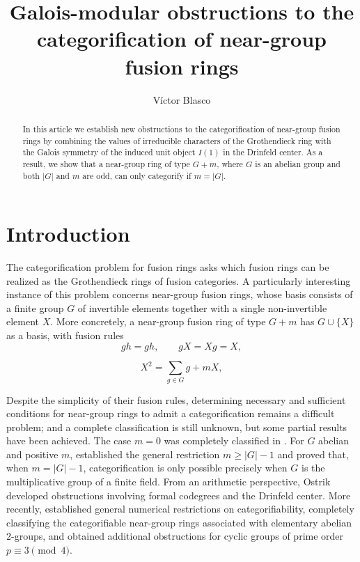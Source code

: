 \documentclass[a4paper,twoside,11pt]{amsart}
\title[Obstructions to the categorification of near-group rings]{Galois-modular obstructions to the categorification of near-group fusion rings}
\author{Víctor Blasco}
\theoremstyle{plain} %
\theoremstyle{definition}
\begin{document}
\begin{abstract}
    In this article we establish new obstructions to the categorification of near-group fusion rings by combining the values of irreducible characters of the Grothendieck ring with the Galois symmetry of the induced unit object $I(1)$ in the Drinfeld center. As a result, we show that a near-group ring of type $G+m$, where $G$ is an abelian group and both $|G|$ and $m$ are odd, can only categorify if  $m=|G|$. 
\end{abstract}
\maketitle
\section{Introduction}
The categorification problem for fusion rings asks which fusion rings can be realized as the Grothendieck rings of fusion categories. A particularly interesting instance of this problem concerns near-group fusion rings, whose basis consists of a finite group $G$ of invertible elements together with a single non-invertible element $X$. More concretely, a near-group fusion ring of type $G+m$  has \(G\cup\{X\}\) as a basis, with fusion rules
\[
gh=gh,\qquad gX=Xg=X,
\]


\[
X^2=\sum_{g\in G}g+mX,
\]
\medskip

Despite the simplicity of their fusion rules, determining necessary and sufficient conditions for near-group rings to admit a categorification remains a difficult problem; and a complete classification is still unknown, but some partial results have been achieved. The case $m=0$ was completely classified in \cite{TY}. For $G$ abelian and positive $m$, \cite{Si} established the general restriction $m\geq |G|-1$ and proved that, when $m=|G|-1$, categorification is only possible precisely when $G$ is the multiplicative group of a finite field. From an arithmetic perspective, Ostrik \cite{O1,O2} developed obstructions involving formal codegrees and the Drinfeld center. More recently, \cite{Sch} established general numerical restrictions on categorifiability, completely classifying the categorifiable near-group rings associated with elementary abelian $2$-groups, and obtained additional obstructions for cyclic groups of prime order $p\equiv 3\pmod 4$.
\medskip
\end{document}

